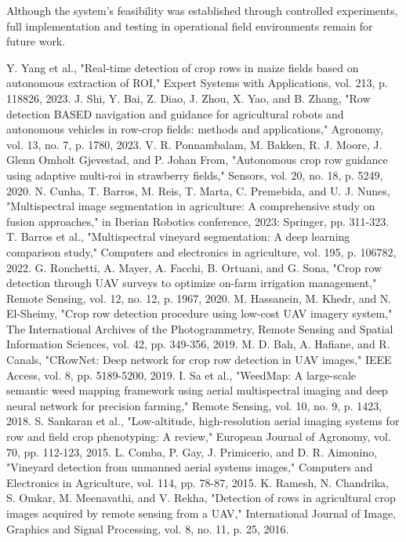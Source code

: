 \documentclass[conference]{IEEEtran}
\begin{document}
	Although the system's feasibility was established through controlled experiments, full implementation and testing in operational field environments remain for future work.
	
	
	\begin{thebibliography}{00}
		 Y. Yang et al., "Real-time detection of crop rows in maize fields based on autonomous extraction of ROI," Expert Systems with Applications, vol. 213, p. 118826, 2023.
		 J. Shi, Y. Bai, Z. Diao, J. Zhou, X. Yao, and B. Zhang, "Row detection BASED navigation and guidance for agricultural robots and autonomous vehicles in row-crop fields: methods and applications," Agronomy, vol. 13, no. 7, p. 1780, 2023.
		 V. R. Ponnambalam, M. Bakken, R. J. Moore, J. Glenn Omholt Gjevestad, and P. Johan From, "Autonomous crop row guidance using adaptive multi-roi in strawberry fields," Sensors, vol. 20, no. 18, p. 5249, 2020.
		 N. Cunha, T. Barros, M. Reis, T. Marta, C. Premebida, and U. J. Nunes, "Multispectral image segmentation in agriculture: A comprehensive study on fusion approaches," in Iberian Robotics conference, 2023: Springer, pp. 311-323.
		 T. Barros et al., "Multispectral vineyard segmentation: A deep learning comparison study," Computers and electronics in agriculture, vol. 195, p. 106782, 2022.
		 G. Ronchetti, A. Mayer, A. Facchi, B. Ortuani, and G. Sona, "Crop row detection through UAV surveys to optimize on-farm irrigation management," Remote Sensing, vol. 12, no. 12, p. 1967, 2020.
		 M. Hassanein, M. Khedr, and N. El-Sheimy, "Crop row detection procedure using low-cost UAV imagery system," The International Archives of the Photogrammetry, Remote Sensing and Spatial Information Sciences, vol. 42, pp. 349-356, 2019.
		 M. D. Bah, A. Hafiane, and R. Canals, "CRowNet: Deep network for crop row detection in UAV images," IEEE Access, vol. 8, pp. 5189-5200, 2019.
		 I. Sa et al., "WeedMap: A large-scale semantic weed mapping framework using aerial multispectral imaging and deep neural network for precision farming," Remote Sensing, vol. 10, no. 9, p. 1423, 2018.
		 S. Sankaran et al., "Low-altitude, high-resolution aerial imaging systems for row and field crop phenotyping: A review," European Journal of Agronomy, vol. 70, pp. 112-123, 2015.
		 L. Comba, P. Gay, J. Primicerio, and D. R. Aimonino, "Vineyard detection from unmanned aerial systems images," Computers and Electronics in Agriculture, vol. 114, pp. 78-87, 2015.
		 K. Ramesh, N. Chandrika, S. Omkar, M. Meenavathi, and V. Rekha, "Detection of rows in agricultural crop images acquired by remote sensing from a UAV," International Journal of Image, Graphics and Signal Processing, vol. 8, no. 11, p. 25, 2016.

\end{thebibliography}
\end{document}
